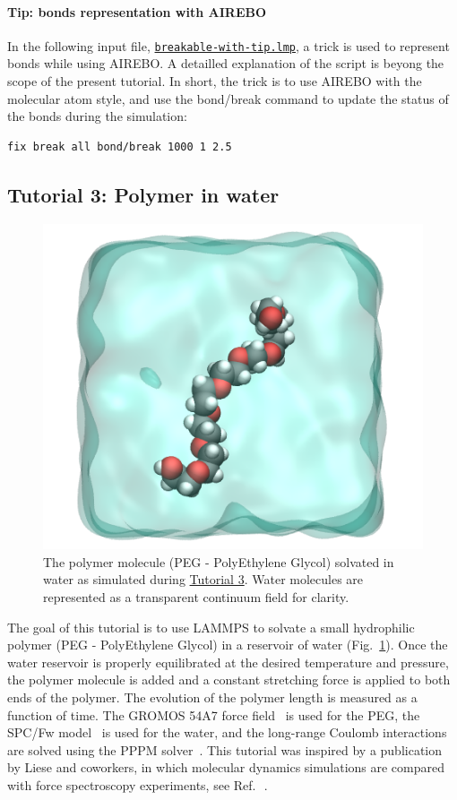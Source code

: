 \documentclass[9pt,tutorial]{livecoms}
\newcommand{\lmpcmd}[1]{\hspace{0pt}\colorbox{listing}{\textcolor{command}{\small{#1}}}\hspace{0pt}} %
\newcommand{\dwlcmd}[1]{\textcolor{download}{\texttt{#1}}} %
\newcommand{\filepath}{https://raw.githubusercontent.com/lammpstutorials/lammpstutorials-article/main/files/}
\begin{document}
\paragraph{Tip: bonds representation with AIREBO}

In the following input file,
\href{\filepath tutorial2/breakable-with-tip.lmp}{\dwlcmd{breakable-with-tip.lmp}},
a trick is used to represent bonds while using AIREBO.  A detailled
explanation of the script is beyong the scope of the present tutorial.
In short, the trick is to use AIREBO with the molecular atom
style, and use the \lmpcmd{bond/break} command to update the status of the bonds
during the simulation:
\begin{lstlisting}
fix break all bond/break 1000 1 2.5
\end{lstlisting}

\subsection{Tutorial 3: Polymer in water}
\label{all-atom-label}

\begin{figure}
\centering
\includegraphics[width=0.55\linewidth]{PEG}
\caption{The polymer molecule (PEG - PolyEthylene Glycol) solvated in water as
simulated during \hyperref[all-atom-label]{Tutorial 3}.  Water molecules are
represented as a transparent continuum field for clarity.}
\label{fig:PEG}
\end{figure}

\noindent The goal of this tutorial is to use LAMMPS to solvate a small hydrophilic
polymer (PEG - PolyEthylene Glycol) in a reservoir of water (Fig.~\ref{fig:PEG}).
Once the water reservoir is properly equilibrated at the desired temperature and
pressure, the polymer molecule is added and a constant stretching force is applied
to both ends of the polymer.  The evolution of the polymer length is measured as
a function of time.  The GROMOS 54A7 force field~\cite{schmid2011definition} is used
for the PEG, the SPC/Fw model~\cite{wu2006flexible} is used for the water, and the
long-range Coulomb interactions are solved using the PPPM solver~\cite{luty1996calculating}.
This tutorial was inspired by a publication by Liese and coworkers, in which molecular
dynamics simulations are compared with force spectroscopy experiments, see Ref.\,~.
\end{document}
